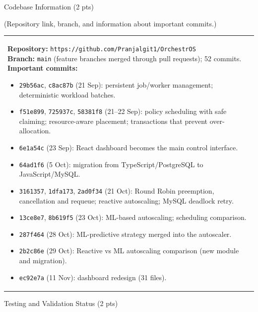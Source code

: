 \documentclass[12pt,a4paper]{article}
\newcommand{\sectiontitle}[1]{%
    {\color{GEUBlue}
    \fontsize{18}{22}\selectfont #1}
}
\newcommand{\instruction}[1]{%
    {\color{InstructionGrey}
    \fontsize{10.5}{13}\selectfont #1}
}
\newcommand{\answerbox}[2]{%
    \noindent
    \begin{tabularx}{\textwidth}{
        |>{\raggedright\arraybackslash}X|}
        \hline
        \parbox[t]{\dimexpr\linewidth-12pt\relax}{
            \vspace{5pt}
            \fontsize{10.5}{13}\selectfont #2
            \par\vspace{6pt}
        }\\
        \hline
    \end{tabularx}
}
\begin{document}
\newpage

\vspace*{0.20cm}

\sectiontitle{Codebase Information (2 pts)}

\vspace{0.05cm}
\instruction{(Repository link, branch, and information about important commits.)}

\vspace{0.20cm}
\answerbox{3.70cm}{%
\textbf{Repository:} \texttt{https://github.com/Pranjalgit1/OrchestrOS}\\
\textbf{Branch:} \texttt{main} (feature branches merged through pull requests); 52 commits.\\[3pt]
\textbf{Important commits:}
\begin{itemize}
    \item \texttt{29b56ac}, \texttt{c8ac87b} (21 Sep): persistent job/worker management; deterministic
    workload batches.
    \item \texttt{f51e899}, \texttt{725937c}, \texttt{58381f8} (21--22 Sep): policy scheduling with safe
    claiming; resource-aware placement; transactions that prevent over-allocation.
    \item \texttt{6e1a54c} (23 Sep): React dashboard becomes the main control interface.
    \item \texttt{64ad1f6} (5 Oct): migration from TypeScript/PostgreSQL to JavaScript/MySQL.
    \item \texttt{3161357}, \texttt{1dfa173}, \texttt{2ad0f34} (21 Oct): Round Robin preemption,
    cancellation and requeue; reactive autoscaling; MySQL deadlock retry.
    \item \texttt{13ce8e7}, \texttt{8b619f5} (23 Oct): ML-based autoscaling; scheduling comparison.
    \item \texttt{287f464} (28 Oct): ML-predictive strategy merged into the autoscaler.
    \item \texttt{2b2c86e} (29 Oct): Reactive vs ML autoscaling comparison (new module and migration).
    \item \texttt{ec92e7a} (11 Nov): dashboard redesign (31 files).
\end{itemize}}

\vspace{0.65cm}

\sectiontitle{Testing and Validation Status (2 pts)}
\end{document}
